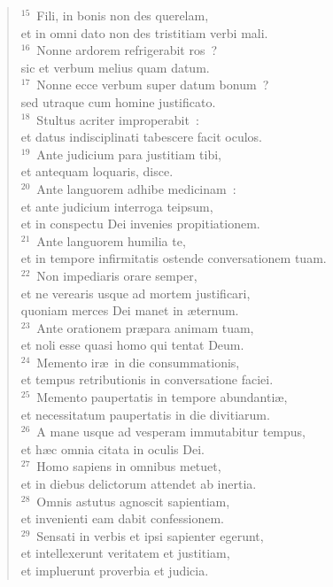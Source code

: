\begin{flushleft}\begin{verse}${}^{15}$~Fili, in bonis non des querelam,\\ et in omni dato non des tristitiam verbi mali.\\
${}^{16}$~Nonne ardorem refrigerabit ros~?\\ sic et verbum melius quam datum.\\
${}^{17}$~Nonne ecce verbum super datum bonum~?\\ sed utraque cum homine justificato.\\
${}^{18}$~Stultus acriter improperabit~:\\ et datus indisciplinati tabescere facit oculos.\\
${}^{19}$~Ante judicium para justitiam tibi,\\ et antequam loquaris, disce.\\
${}^{20}$~Ante languorem adhibe medicinam~:\\ et ante judicium interroga teipsum,\\ et in conspectu Dei invenies propitiationem.\\
${}^{21}$~Ante languorem humilia te,\\ et in tempore infirmitatis ostende conversationem tuam.\\
${}^{22}$~Non impediaris orare semper,\\ et ne verearis usque ad mortem justificari,\\ quoniam merces Dei manet in \ae ternum.\\
${}^{23}$~Ante orationem pr\ae para animam tuam,\\ et noli esse quasi homo qui tentat Deum.\\
${}^{24}$~Memento ir\ae\ in die consummationis,\\ et tempus retributionis in conversatione faciei.\\
${}^{25}$~Memento paupertatis in tempore abundanti\ae ,\\ et necessitatum paupertatis in die divitiarum.\\
${}^{26}$~A mane usque ad vesperam immutabitur tempus,\\ et h\ae c omnia citata in oculis Dei.\\
${}^{27}$~Homo sapiens in omnibus metuet,\\ et in diebus delictorum attendet ab inertia.\\
${}^{28}$~Omnis astutus agnoscit sapientiam,\\ et invenienti eam dabit confessionem.\\
${}^{29}$~Sensati in verbis et ipsi sapienter egerunt,\\ et intellexerunt veritatem et justitiam,\\ et impluerunt proverbia et judicia.\end{verse}\end{flushleft}


